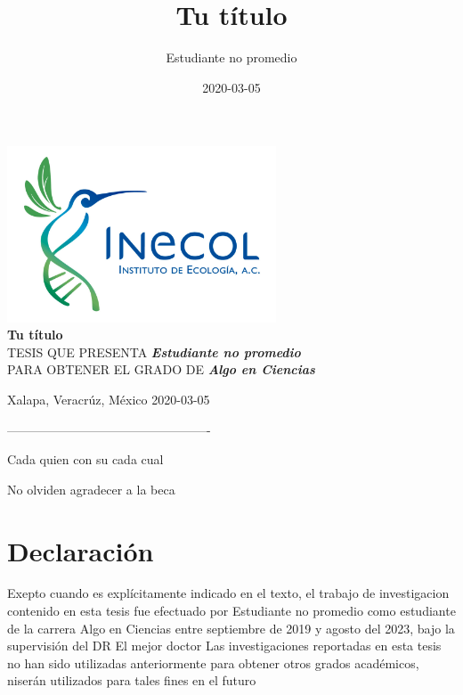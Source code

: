 \documentclass[12pt,twoside]{reedthesis}
\title{Tu título}
\author{Estudiante no promedio}
\date{2020-03-05}
\begin{document}
%
\frontmatter %
\pagestyle{empty} %
\begin{flushleft}
  
  \medskip
  \medskip
  \includegraphics[width=0.60\textwidth]{Inecol.jpeg}\\\vspace {3.cm} 
  {\Large{\bf Tu título}}\\\vspace{3.cm} 
  TESIS QUE PRESENTA \textit{\textbf{Estudiante no promedio}}\\
  PARA OBTENER EL GRADO DE \textit{\textbf{Algo en Ciencias}}\\\vspace{2.cm} 
  \medskip
  \medskip
  
  Xalapa, Veracrúz, México 2020-03-05
  
-------------------------------------------------  
\end{flushleft}
  \begin{dedication}
    Cada quien con su cada cual
  \end{dedication}
  \begin{acknowledgements}
    No olviden agradecer a la beca
  \end{acknowledgements}
\newpage
\thispagestyle{empty}
\hypertarget{declaration-of-authorship}{%
\section*{Declaración}\label{declaration-of-authorship}}

Exepto cuando es explícitamente indicado en el texto, el trabajo de investigacion contenido en esta tesis fue efectuado por Estudiante no promedio como estudiante de la carrera Algo en Ciencias entre septiembre de 2019 y agosto del 2023, bajo la supervisión del DR El mejor doctor
\vspace{1cm}
Las investigaciones reportadas en esta tesis no han sido utilizadas anteriormente para obtener otros grados académicos, niserán utilizados para tales fines en el futuro
\end{document}
